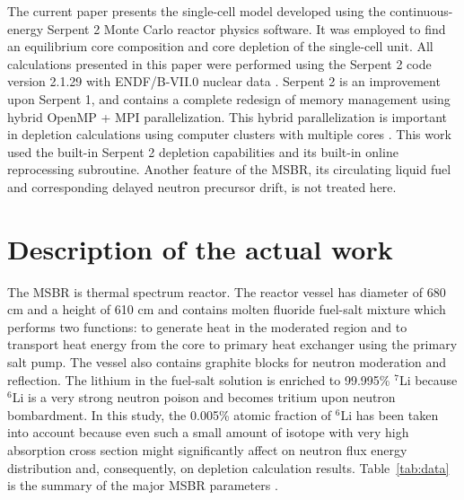 \documentclass{anstrans}
\begin{document}
The current paper presents the single-cell model developed using the
continuous-energy Serpent 2 Monte Carlo reactor physics software. It was 
employed to find an equilibrium core composition and core depletion of the 
single-cell unit. 
All calculations presented in this paper were performed using the Serpent 2 
code version 2.1.29 with ENDF/B-VII.0
nuclear data \cite{leppanen_serpent_2012,chadwick_endf/b-vii.0:_2006}. Serpent 
2 is an improvement upon Serpent 1, and contains a complete 
redesign of memory management using hybrid OpenMP + MPI parallelization.  This 
hybrid parallelization is important in depletion calculations using computer 
clusters with multiple cores \cite{leppanen_serpent_2015}. This work used the 
built-in Serpent 2 depletion capabilities and its built-in online reprocessing 
subroutine. Another feature of the \gls{MSBR}, its circulating liquid fuel and 
corresponding delayed neutron precursor drift, is not treated here.

\section{Description of the actual work}
The \gls{MSBR} is thermal spectrum reactor. The reactor vessel has diameter of 
680 cm and a height of 610 cm and contains molten fluoride fuel-salt mixture 
which performs two functions: to generate heat in the moderated region and to 
transport heat energy from the core to primary heat exchanger using the primary 
salt pump. The vessel also contains graphite blocks for neutron moderation and 
reflection. The lithium in the fuel-salt solution is enriched to 99.995\% 
$^7$Li because $^6$Li is a very strong neutron poison and becomes tritium upon 
neutron bombardment. In this study, the 0.005\% atomic fraction of $^6$Li has 
been taken into account because even such a small amount of isotope with very 
high absorption cross section might significantly affect on neutron flux energy 
distribution and, consequently, on depletion calculation results. 
Table~\ref{tab:data} is the summary of the major \gls{MSBR} parameters 
\cite{robertson_conceptual_1971}. 
\end{document}
